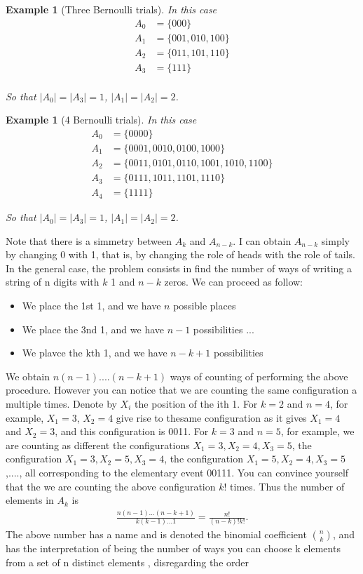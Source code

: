 \documentclass[12pt]{article}
\newtheorem{example}[theorem]{Example}
\newcommand{\<}{{\langle \!\! \langle}}
\renewcommand{\>}{{\rangle \!\! \rangle}}
\newcommand{\bel}[2]{\begin{equation} \label{#1} \begin{split} #2
 					\end{split} \end{equation}}
\begin{document}
\begin{example}[Three Bernoulli trials]

	In this case \bel{}{A_0 & = \{000\}\\
				A_1 & =\{001,010,100\}\\
				A_2 & =\{011,101,110\}\\
				A_3 & = \{111\}\\
				}

			So that $|A_0|=|A_3| = 1 $, $|A_1 |= |A_2| =2$.
\end{example} 



\begin{example}[4 Bernoulli trials]

	In this case \bel{}{A_0 & = \{0000\}\\
				A_1 & =\{0001,0010,0100,1000\}\\
				A_2 & =\{0011,0101,0110,1001,1010,1100\}\\
				A_3 & = \{0111,1011,1101,1110\}\\
				A_4 & = \{1111\}
				}

			So that $|A_0|=|A_3| = 1 $, $|A_1 |= |A_2| =2$.
\end{example} 
Note that there is a simmetry between $A_k$ and $A_{n-k}$. I can obtain $A_{n-k}$ simply by changing 0 with 1, that is, by changing the role of heads with the role of tails. In the general case, the problem consists in find the number of ways of writing a string of n digits with $k$ 1 and $n-k$ zeros. We can proceed as follow: 
\begin{itemize}
	\item We place the 1st 1, and we have $n$ possible places 
	\item We place the 3nd 1, and we have $n-1$ possibilities 
		... 
	\item We plavce the kth 1, and we have $n-k+1$ possibilities
\end{itemize}


We obtain $n(n-1)....(n-k+1)$ ways of counting of performing the above procedure. However you can notice that we are counting the same configuration a multiple times. Denote by $X_i$ the position of the ith 1. For $k=2$ and $n=4$, for example, $X_1 = 3$, $X_2 = 4$ give rise to thesame configuration as it gives $X_1 = 4 $ and $X_2 =3$, and this configuration is 0011.  For $k= 3$ and $n=5$, for example, we are counting as different the configurations $X_1 = 3, X_2=4, X_3=5$,  the configuration $X_1 =3 ,X_2= 5 , X_3 =4$, the configuration $X_1 = 5, X_2 = 4, X_3 =5 $,...., all corresponding to the elementary event  00111. You can convince yourself that the we are counting the above configuration $k!$ times. Thus the number of elements in $A_k$ is 
\bel{}{\frac{n(n-1)...(n-k+1)}{k(k-1)...1}= \frac{n!}{(n-k)!k!}.}
The above number has a name and is denoted the binomial coefficient $n\choose{k}$, and has the interpretation of being the number of ways you can choose k elements from a set of n distinct elements , disregarding the order 
\end{document}
